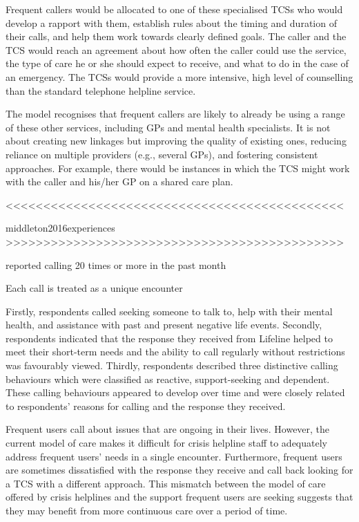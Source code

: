 Frequent callers would be allocated to one of these specialised TCSs who would develop a rapport with them, establish rules about the timing and duration of their calls, and help them work towards clearly defined goals. The caller and the TCS would reach an agreement about how often the caller could use the service, the type of care he or she should expect to receive, and what to do in the case of an emergency. The TCSs would provide a more intensive, high level of counselling than the standard telephone helpline service.

The model recognises that frequent callers are likely to already be using a range of these other services, including GPs and mental health specialists. It is not about creating new linkages but improving the quality of existing ones, reducing reliance on multiple providers (e.g., several GPs), and fostering consistent approaches. For example, there would be instances in which the TCS might work with the caller and his/her GP on a shared care plan.


<<<<<<<<<<<<<<<<<<<<<<<<<<<<<<<<<<<<<<<<<<<<<


middleton2016experiences
>>>>>>>>>>>>>>>>>>>>>>>>>>>>>>>>>>>>>>>>>>>>>

reported calling 20 times or more in the past month 

Each call is treated as a unique encounter 

Firstly, respondents called seeking someone to talk to, help with their mental health, and assistance with past and present negative life events. Secondly, respondents indicated that the response they received from Lifeline helped to meet their short-term needs and the ability to call regularly without restrictions was favourably viewed. Thirdly, respondents described three distinctive calling behaviours which were classified as reactive, support-seeking and dependent. These calling behaviours appeared to develop over time and were closely related to respondents’ reasons for calling and the response they received.

Frequent users call about issues that are ongoing in their lives. However, the current model of care makes it difficult for crisis helpline staff to adequately address frequent users’ needs in a single encounter. Furthermore, frequent users are sometimes dissatisfied with the response they receive and call back looking for a TCS with a different approach. This mismatch between the model of care offered by crisis helplines and the support frequent users are seeking suggests that they may benefit from more continuous care over a period of time.


